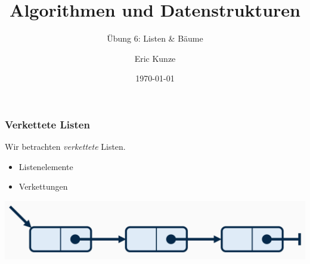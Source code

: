 \documentclass{beamer}
\begin{document}
	
	\title{Algorithmen und Datenstrukturen}
	\subtitle{Übung 6: Listen \& Bäume}
	\author{Eric Kunze}
	\date{\today}

	\maketitle



\begin{frame}[fragile] \frametitle{Verkettete Listen}
	Wir betrachten \textit{verkettete} Listen.
	\begin{itemize}
		\item Listenelemente
		\item Verkettungen
	\end{itemize}
	
	\includegraphics[width=\linewidth]{tut06-graphics/tut06-liste.jpg}
\end{frame}
\end{document}
